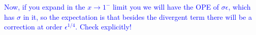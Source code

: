 \documentclass[11pt]{article}
\newcommand{\NL}[1]{\textcolor{blue}{#1}}
\begin{document}
\NL{Now, if you expand in the $x\to 1^-$ limit you we will have the OPE of $\sigma \epsilon$, which has $\sigma$ in it, so the expectation is that besides the divergent term there will be a correction at order $\epsilon^{1/4}$. Check explicitly! }
 
  

\end{document}
